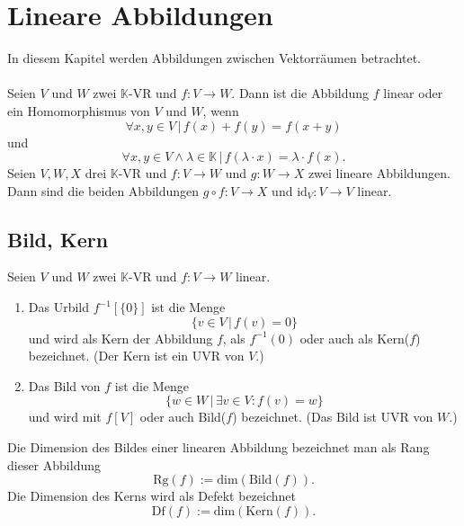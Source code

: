 \documentclass[a4paper,12pt]{article}
\begin{document}
\section{Lineare Abbildungen}
In diesem Kapitel werden Abbildungen zwischen Vektorräumen betrachtet.\\\\
Seien $V$ und $W$ zwei $\mathbb{K}$-VR und $f:V\rightarrow W$. Dann ist die Abbildung $f$ linear oder ein Homomorphismus von $V$ und $W$, wenn
\[ 
        \forall x,y \in V\,|\, f\left(x\right)+f\left(y\right)=f\left(x+y\right)
\] 
und
\[ 
        \forall x,y \in V\land \lambda  \in \mathbb{K}\,|\, f\left(\lambda \cdot x\right)=\lambda \cdot f\left(x\right)
.\] 
Seien $V,W,X$ drei $\mathbb{K}$-VR und $f:V\rightarrow W$ und $g:W\rightarrow X$ zwei lineare Abbildungen. Dann sind die beiden Abbildungen $g\circ f:V\rightarrow X$ und $\text{id}_V:V\rightarrow V$ linear.
 
\subsection{Bild, Kern}
Seien $V$ und $W$ zwei $\mathbb{K}$-VR und $f:V\rightarrow W$ linear.
\begin{enumerate}[label=\arabic*]
        \item Das Urbild $f^{-1}[\{0\}]$ ist die Menge 
                \[ 
                        \{v \in V\,|\, f\left(v\right)=0\}
                \] 
                und wird als Kern der Abbildung $f$, als $f^{-1}\left(0\right)$ oder auch als Kern($f$) bezeichnet. (Der Kern ist ein UVR von $V$.)
        \item Das Bild von $f$ ist die Menge
                \[ 
                        \{w \in W\,|\, \exists v \in V:f\left(v\right)=w\}
                \] 
                und wird mit $f[V]$ oder auch Bild($f$) bezeichnet. (Das Bild ist UVR von $W$.) 
\end{enumerate}
Die Dimension des Bildes einer linearen Abbildung bezeichnet man als Rang dieser Abbildung
\[ 
        \text{Rg}\left(f\right):=\text{dim}\left(\text{Bild}\left(f\right)\right)
.\] 
Die Dimension des Kerns wird als Defekt bezeichnet
\[ 
        \text{Df}\left(f\right):=\text{dim}\left(\text{Kern}\left(f\right)\right)
.\] 
\end{document}
